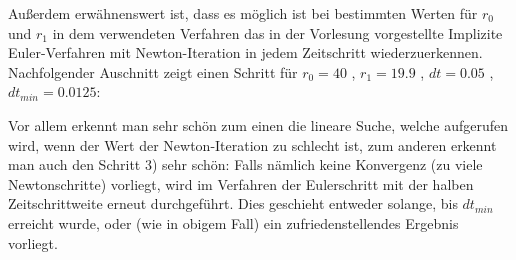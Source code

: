 Außerdem erwähnenswert ist, dass es möglich ist bei bestimmten Werten für $r_0$ und $r_1$ in dem verwendeten Verfahren das in der Vorlesung vorgestellte Implizite Euler-Verfahren mit Newton-Iteration in jedem Zeitschritt wiederzuerkennen.
Nachfolgender Auschnitt zeigt einen Schritt für $r_0 = 40$ , $r_1=19.9$ , $dt = 0.05$ , $dt_{min}=0.0125$:
\begin{figure}[H]
	\centering
\end{figure}
Vor allem erkennt man sehr schön zum einen die lineare Suche, welche aufgerufen wird, wenn der Wert der Newton-Iteration zu schlecht ist, zum anderen erkennt man auch den Schritt 3) sehr schön: 
Falls nämlich keine Konvergenz (zu viele Newtonschritte) vorliegt, wird im Verfahren der Eulerschritt mit der halben Zeitschrittweite erneut durchgeführt. Dies geschieht entweder solange, bis $dt_{min}$ erreicht wurde, oder (wie in obigem Fall) ein zufriedenstellendes Ergebnis vorliegt.
